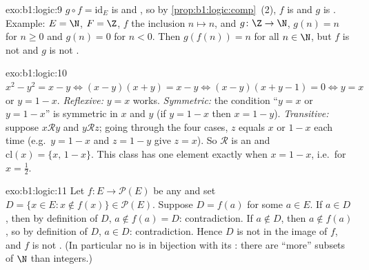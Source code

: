 \begin{solution}{exo:b1:logic:9}
$g \circ f = \mathrm{id}_E$ is  and , so by
\cref{prop:b1:logic:comp}~(2), $f$ is  and $g$ is .
Example: $E = \N$, $F = \Z$, $f$ the inclusion $n \mapsto n$, and
$g \colon \Z \to \N$, $g(n) = n$ for $n \geq 0$ and $g(n) = 0$ for
$n < 0$. Then $g(f(n)) = n$ for all $n \in \N$, but $f$ is not
 and $g$ is not .
\end{solution}

\begin{solution}{exo:b1:logic:10}
$x^2 - y^2 = x - y \iff (x - y)(x + y) = x - y \iff (x - y)(x + y - 1)
= 0 \iff y = x$ or $y = 1 - x$. \emph{Reflexive:} $y = x$ works.
\emph{Symmetric:} the condition ``$y = x$ or $y = 1 - x$'' is
symmetric in $x$ and $y$ (if $y = 1 - x$ then $x = 1 - y$).
\emph{Transitive:} suppose $x \mathbin{\mathcal{R}} y$ and $y
\mathbin{\mathcal{R}} z$; going through the four cases, $z$ equals $x$
or $1 - x$ each time (e.g.\ $y = 1 - x$ and $z = 1 - y$ give $z = x$).
So $\mathcal{R}$ is an  and $\mathrm{cl}(x) =
\{x,\, 1 - x\}$. This class has one element exactly when $x = 1 - x$,
i.e.\ for $x = \frac12$.
\end{solution}

\begin{solution}{exo:b1:logic:11}
Let $f \colon E \to \mathcal{P}(E)$ be any  and set
$D = \{x \in E : x \notin f(x)\} \in \mathcal{P}(E)$. Suppose $D =
f(a)$ for some $a \in E$. If $a \in D$, then by definition of $D$,
$a \notin f(a) = D$: contradiction. If $a \notin D$, then $a \notin
f(a)$, so by definition of $D$, $a \in D$: contradiction. Hence $D$ is
not in the image of $f$, and $f$ is not . (In particular no
 is in bijection with its : there are ``more'' subsets of
$\N$ than integers.)
\end{solution}

